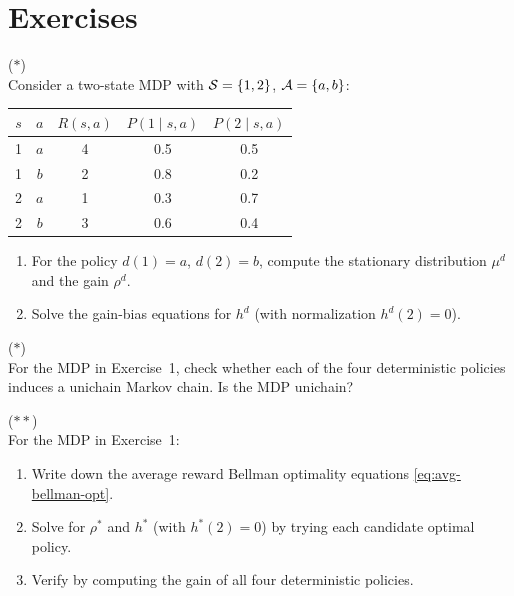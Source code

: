 \documentclass[11pt,a4paper]{article}
\begin{document}
\section{Exercises}
\label{sec:exercises}

\begin{exercise} \textnormal{(\(*\))} \\
Consider a two-state MDP with $\mathcal{S} = \{1, 2\}$,
$\mathcal{A} = \{a, b\}$:
\begin{center}
\begin{tabular}{ccccc}
\toprule
$s$ & $a$ & $R(s,a)$ & $P(1 \mid s,a)$ & $P(2 \mid s,a)$ \\
\midrule
1 & $a$ & 4 & 0.5 & 0.5 \\
1 & $b$ & 2 & 0.8 & 0.2 \\
2 & $a$ & 1 & 0.3 & 0.7 \\
2 & $b$ & 3 & 0.6 & 0.4 \\
\bottomrule
\end{tabular}
\end{center}
\begin{enumerate}[label=(\alph*)]
    \item For the policy $d(1) = a$, $d(2) = b$, compute the
    stationary distribution $\mu^d$ and the gain $\rho^d$.
    \item Solve the gain-bias equations for $h^d$ (with
    normalization $h^d(2) = 0$).
\end{enumerate}
\end{exercise}

\begin{exercise} \textnormal{(\(*\))} \\
For the MDP in Exercise~1, check whether each of the four
deterministic policies induces a unichain Markov chain. Is the MDP
unichain?
\end{exercise}

\begin{exercise}
\textnormal{(\(**\))} \\
For the MDP in Exercise~1:
\begin{enumerate}[label=(\alph*)]
    \item Write down the average reward Bellman optimality equations
    \eqref{eq:avg-bellman-opt}.
    \item Solve for $\rho^*$ and $h^*$ (with $h^*(2) = 0$) by
    trying each candidate optimal policy.
    \item Verify by computing the gain of all four deterministic
    policies.
\end{enumerate}
\end{exercise}
\end{document}
